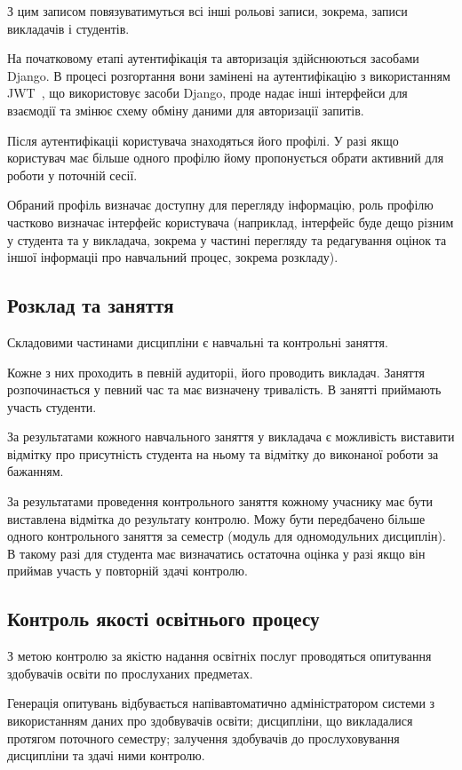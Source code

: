 З цим записом повязуватимуться всі інші рольові записи, зокрема, записи викладачів і студентів.

На початковому етапі аутентифікація та авторизація здійснюються засобами Django. В процесі розгортання вони замінені на  аутентифікацію з використанням JWT~\cite{гетьман2020}, що використовує засоби Django, проде надає інші інтерфейси для взаємодії та змінює схему обміну даними для авторизації запитів.

Після аутентифікаціі користувача знаходяться його профілі. У разі якщо користувач має більше одного профілю йому пропонується обрати активний для роботи у поточній сесії. 

Обраний профіль визначає доступну для перегляду інформацію, роль профілю частково визначає інтерфейс користувача (наприклад, інтерфейс буде дещо різним у студента та у викладача, зокрема у частині перегляду та редагування оцінок та іншої інформаціі про навчальний процес, зокрема розкладу).

\subsection{Розклад та заняття}

Складовими частинами дисципліни є навчальні та контрольні заняття.

Кожне з них проходить в певній аудиторіі, його проводить викладач. Заняття розпочинається у певний час та має визначену тривалість. В занятті приймають участь студенти.

За результатами кожного навчального заняття у викладача є можливість виставити відмітку про присутність студента на ньому та відмітку до виконаної роботи за бажанням.

За результатами проведення контрольного заняття кожному учаснику має бути виставлена відмітка до результату контролю. Можу бути передбачено більше одного контрольного заняття за семестр (модуль для одномодульних дисциплін). В такому разі для студента має визначатись остаточна оцінка у разі якщо він приймав участь у повторній здачі контролю.

\subsection{Контроль якості освітнього процесу}

З метою контролю за якістю надання освітніх послуг проводяться опитування здобувачів освіти по прослуханих предметах.

Генерація опитувань відбувається напівавтоматично адміністратором системи з використанням даних про здобвувачів освіти; дисципліни, що викладалися протягом поточного семестру; залучення здобувачів до прослуховування дисципліни та здачі ними контролю.

